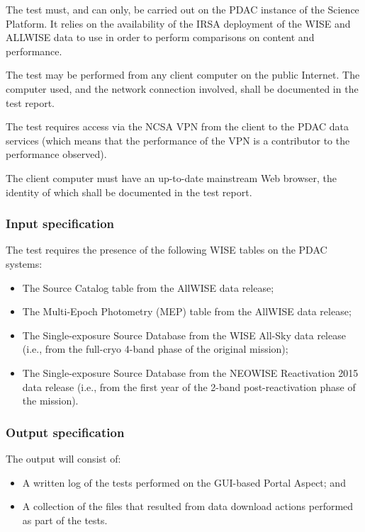 The test must, and can only, be carried out on the PDAC instance of the Science Platform.
It relies on the availability of the IRSA deployment of the WISE and ALLWISE data to use in order to perform comparisons on content and performance.

The test may be performed from any client computer on the public Internet.
The computer used, and the network connection involved, shall be documented in the test report.

The test requires access via the NCSA VPN from the client to the PDAC data services 
(which means that the performance of the VPN is a contributor to the performance observed).

The client computer must have an up-to-date mainstream Web browser, the identity of which shall be documented in the test report.

\subsubsection{Input specification}

The test requires the presence of the following WISE tables on the PDAC systems:

\begin{itemize}

  \item{The Source Catalog table from the AllWISE data release;}
  \item{The Multi-Epoch Photometry (MEP) table from the AllWISE data release;}
  \item{The Single-exposure Source Database from the WISE All-Sky data release (i.e., from the full-cryo 4-band phase of the original mission);}
  \item{The Single-exposure Source Database from the NEOWISE Reactivation 2015 data release (i.e., from the first year of the 2-band post-reactivation phase of the mission).}
\end{itemize}


\subsubsection{Output specification}

The output will consist of:

\begin{itemize}
  \item{A written log of the tests performed on the GUI-based Portal Aspect; and}
  \item{A collection of the files that resulted from data download actions performed as part of the tests.}
\end{itemize}


